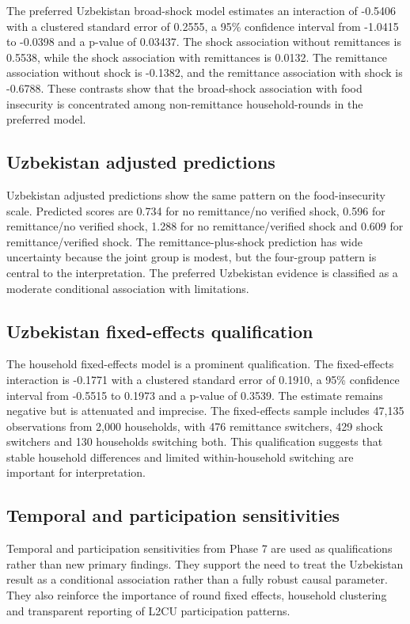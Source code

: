 \documentclass[11pt]{article}
\begin{document}
The preferred Uzbekistan broad-shock model estimates an interaction of -0.5406 with a clustered standard error of 0.2555, a 95\% confidence interval from -1.0415 to -0.0398 and a p-value of 0.03437. The shock association without remittances is 0.5538, while the shock association with remittances is 0.0132. The remittance association without shock is -0.1382, and the remittance association with shock is -0.6788. These contrasts show that the broad-shock association with food insecurity is concentrated among non-remittance household-rounds in the preferred model.

\subsection{Uzbekistan adjusted predictions}

Uzbekistan adjusted predictions show the same pattern on the food-insecurity scale. Predicted scores are 0.734 for no remittance/no verified shock, 0.596 for remittance/no verified shock, 1.288 for no remittance/verified shock and 0.609 for remittance/verified shock. The remittance-plus-shock prediction has wide uncertainty because the joint group is modest, but the four-group pattern is central to the interpretation. The preferred Uzbekistan evidence is classified as a moderate conditional association with limitations.

\subsection{Uzbekistan fixed-effects qualification}

The household fixed-effects model is a prominent qualification. The fixed-effects interaction is -0.1771 with a clustered standard error of 0.1910, a 95\% confidence interval from -0.5515 to 0.1973 and a p-value of 0.3539. The estimate remains negative but is attenuated and imprecise. The fixed-effects sample includes 47,135 observations from 2,000 households, with 476 remittance switchers, 429 shock switchers and 130 households switching both. This qualification suggests that stable household differences and limited within-household switching are important for interpretation.

\subsection{Temporal and participation sensitivities}

Temporal and participation sensitivities from Phase 7 are used as qualifications rather than new primary findings. They support the need to treat the Uzbekistan result as a conditional association rather than a fully robust causal parameter. They also reinforce the importance of round fixed effects, household clustering and transparent reporting of L2CU participation patterns.
\end{document}
